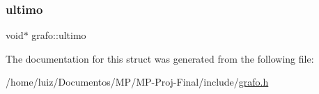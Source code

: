 \mbox{\label{structgrafo_a48efa4c0bd5f3ed6dc25b56995d194e0}} 
\subsubsection{\texorpdfstring{ultimo}{ultimo}}
{\footnotesize\ttfamily void$\ast$ grafo\+::ultimo}



The documentation for this struct was generated from the following file\+:\begin{DoxyCompactItemize}
\item 
/home/luiz/\+Documentos/\+M\+P/\+M\+P-\/\+Proj-\/\+Final/include/\hyperlink{grafo_8h}{grafo.\+h}\end{DoxyCompactItemize}
